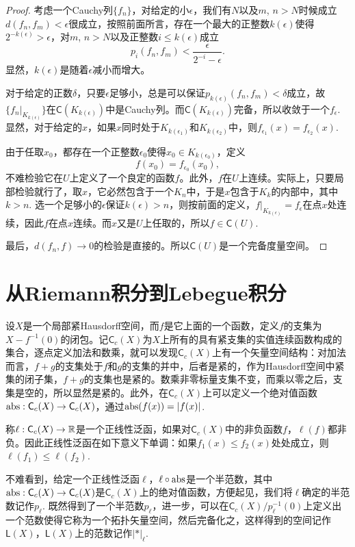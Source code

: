 \begin{proof}
考虑一个Cauchy列$\{f_n\}$，对给定的小$\epsilon$，我们有$N$以及$m$, $n>N$时候成立$d(f_n,f_m)<\epsilon$很成立，按照前面所言，存在一个最大的正整数$k(\epsilon)$使得$2^{-k(\epsilon)}>\epsilon$，对$m$, $n>N$以及正整数$i\leq k(\epsilon)$成立
\[
	p_i(f_n,f_m)<\frac{\epsilon}{2^{-i}-\epsilon}.
\]
显然，$k(\epsilon)$是随着$\epsilon$减小而增大。

对于给定的正数$\delta$，只要$\epsilon$足够小，总是可以保证$p_{k(\epsilon)}(f_n,f_m)<\delta$成立，故$\{f_n|_{K_{k(\epsilon)}}\}$在$\mathsf{C}(K_{k(\epsilon)})$中是Cauchy列。而$\mathsf{C}(K_{k(\epsilon)})$完备，所以收敛于一个$f_\epsilon$. 显然，对于给定的$x$，如果$x$同时处于$K_{k(\epsilon_1)}$和$K_{k(\epsilon_2)}$中，则$f_{\epsilon_1}(x)=f_{\epsilon_2}(x)$.

由于任取$x_0$，都存在一个正整数$\epsilon_0$使得$x_0\in K_{k(\epsilon_0)}$，定义
\[
	f(x_0)=f_{\epsilon_0}(x_0),
\]
不难检验它在$U$上定义了一个良定的函数$f$。此外，$f$在$U$上连续。实际上，只要局部检验就行了，取$x$，它必然包含于一个$K_n$中，于是$x$包含于$K_{k}$的内部中，其中$k>n$. 选一个足够小的$\epsilon$保证$k(\epsilon)>n$，则按前面的定义，$f|_{K_{k(\epsilon)}}=f_{\epsilon}$在点$x$处连续，因此$f$在点$x$连续。而$x$又是$U$上任取的，所以$f\in \mathsf{C} (U)$.

最后，$d(f_n,f)\to 0$的检验是直接的。所以$\mathsf{C}(U)$是一个完备度量空间。
\end{proof}

\section{从Riemann积分到Lebegue积分}

设$X$是一个局部紧Hausdorff空间，而$f$是它上面的一个函数，定义$f$的支集为$X-f^{-1}(0)$的闭包。记$\mathsf{C}_c(X)$为$X$上所有的具有紧支集的实值连续函数构成的集合，逐点定义加法和数乘，就可以发现$\mathsf{C}_c(X)$上有一个矢量空间结构：对加法而言，$f+g$的支集处于$f$和$g$的支集的并中，后者是紧的，作为Hausdorff空间中紧集的闭子集，$f+g$的支集也是紧的。数乘非零标量支集不变，而乘以零之后，支集是空的，所以显然是紧的。此外，在$\mathsf{C}_c(X)$上可以定义一个绝对值函数$\operatorname{abs}:\mathsf{C}_c(X)\to \mathsf{C}_c(X)$，通过$\operatorname{abs}(f(x))=|f(x)|$. 

称$\ell:\mathsf{C}_c(X)\to \mathbb{R}$是一个正线性泛函，如果对$\mathsf{C}_c(X)$中的非负函数$f$，$\ell(f)$都非负。因此正线性泛函在如下意义下单调：如果$f_1(x)\leq f_2(x)$处处成立，则$\ell(f_1)\leq \ell(f_2)$.

不难看到，给定一个正线性泛函$\ell$，$\ell\circ \operatorname{abs}$是一个半范数，其中$\operatorname{abs}:\mathsf{C}_c(X)\to \mathsf{C}_c(X)$是$\mathsf{C}_c(X)$上的绝对值函数，方便起见，我们将$\ell$确定的半范数记作$p_\ell$. 既然得到了一个半范数$p_\ell$，进一步，可以在$\mathsf{C}_c(X)/p_\ell^{-1}(0)$上定义出一个范数使得它称为一个拓扑矢量空间，然后完备化之，这样得到的空间记作$\mathsf{L}(X)$，$\mathsf{L}(X)$上的范数记作$|*|_\ell$. 

